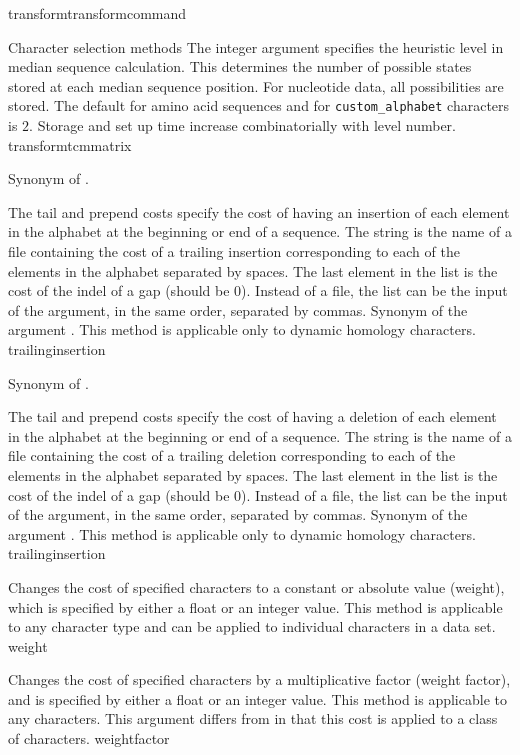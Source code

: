 \begin{command}{transform}{transformcommand}
\begin{arguments}
\begin{argumentgroup}{Character selection methods}
{The integer argument specifies the heuristic level in median sequence 
calculation. This determines the number of possible states stored at 
each median sequence position. For nucleotide data, all possibilities 
are stored. The default for amino acid sequences and for 
\texttt{custom\_alphabet} characters is $2$. Storage and set up time 
increase combinatorially with level number.}
{transformtcmmatrix}

{Synonym of .}
{}

{The tail and prepend costs specify the cost of having an insertion of
each element in the alphabet at the beginning or end
of a sequence. The string is the name of a file containing the cost of
a trailing insertion corresponding to each of the elements
in the alphabet separated by spaces. The last element in the list is the
cost of the indel of a gap (should be 0). Instead of a file, the list can
be the input of the argument, in the same order, separated by commas.
Synonym of the argument . This method is applicable 
only to dynamic homology characters.} 
{trailinginsertion}

{Synonym of .}
{}

{The tail and prepend costs specify the cost of having a deletion
of each element in the alphabet at the beginning or end
of a sequence. The string is the name of a file containing the cost of
a trailing deletion corresponding to each of the elements
in the alphabet separated by spaces. The last element in the list is the
cost of the indel of a gap (should be 0). Instead of a file, the list can
be the input of the argument, in the same order, separated by commas.
Synonym of the argument . This method is applicable 
only to dynamic homology characters.} 
{trailinginsertion}

{Changes the cost of specified characters to a constant or absolute value 
(weight), which is specified by either a float or an integer value. 
This method is applicable to any character type and can be applied to individual 
characters in a data set.} 
{weight}

{Changes the cost of specified characters by a multiplicative factor (weight factor), 
and is specified by either a float or an integer value. This method is applicable to any characters.
This argument differs from  in that this cost is applied to a class
of characters.} 
{weightfactor}


\end{argumentgroup}
\end{arguments}
\end{command}
